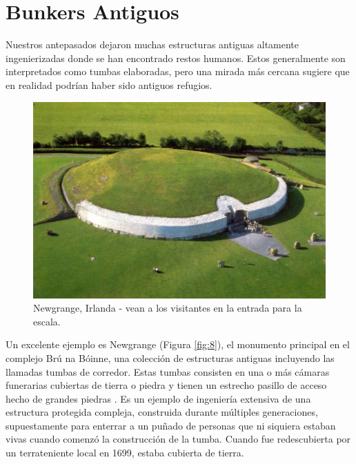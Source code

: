\documentclass[10pt,twocolumn,letterpaper]{article}
\begin{document}
\section{Bunkers Antiguos}
Nuestros antepasados dejaron muchas estructuras antiguas altamente ingenierizadas donde se han encontrado restos humanos. Estos generalmente son interpretados como tumbas elaboradas, pero una mirada más cercana sugiere que en realidad podrían haber sido antiguos refugios.

\begin{figure}[b]
\begin{center}
   \includegraphics[width=1\linewidth]{ww19.jpg}
\end{center}
   \caption{Newgrange, Irlanda - vean a los visitantes en la entrada para la escala.}
\label{fig:8}
\label{fig:onecol}
\end{figure}

Un excelente ejemplo es Newgrange (Figura \ref{fig:8}), el monumento principal en el complejo Brú na Bóinne, una colección de estructuras antiguas incluyendo las llamadas tumbas de corredor. Estas tumbas consisten en una o más cámaras funerarias cubiertas de tierra o piedra y tienen un estrecho pasillo de acceso hecho de grandes piedras \cite{70}. Es un ejemplo de ingeniería extensiva de una estructura protegida compleja, construida durante múltiples generaciones, supuestamente para enterrar a un puñado de personas que ni siquiera estaban vivas cuando comenzó la construcción de la tumba. Cuando fue redescubierta por un terrateniente local en 1699, estaba cubierta de tierra.
\end{document}
